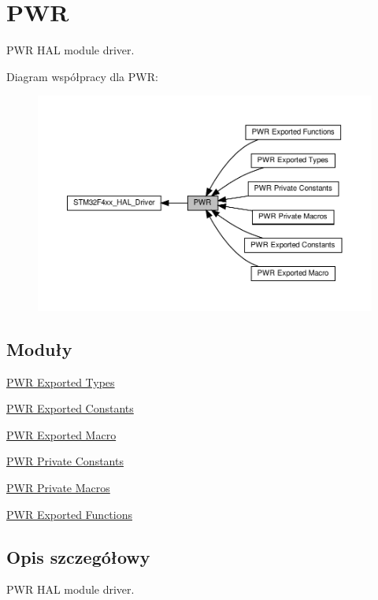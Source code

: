 \hypertarget{group___p_w_r}{}\section{P\+WR}
\label{group___p_w_r}


P\+WR H\+AL module driver.  


Diagram współpracy dla P\+WR\+:\nopagebreak
\begin{figure}[H]
\begin{center}
\leavevmode
\includegraphics[width=350pt]{group___p_w_r}
\end{center}
\end{figure}
\subsection*{Moduły}
\begin{DoxyCompactItemize}
\item 
\hyperlink{group___p_w_r___exported___types}{P\+W\+R Exported Types}
\item 
\hyperlink{group___p_w_r___exported___constants}{P\+W\+R Exported Constants}
\item 
\hyperlink{group___p_w_r___exported___macro}{P\+W\+R Exported Macro}
\item 
\hyperlink{group___p_w_r___private___constants}{P\+W\+R Private Constants}
\item 
\hyperlink{group___p_w_r___private___macros}{P\+W\+R Private Macros}
\item 
\hyperlink{group___p_w_r___exported___functions}{P\+W\+R Exported Functions}
\end{DoxyCompactItemize}


\subsection{Opis szczegółowy}
P\+WR H\+AL module driver. 

